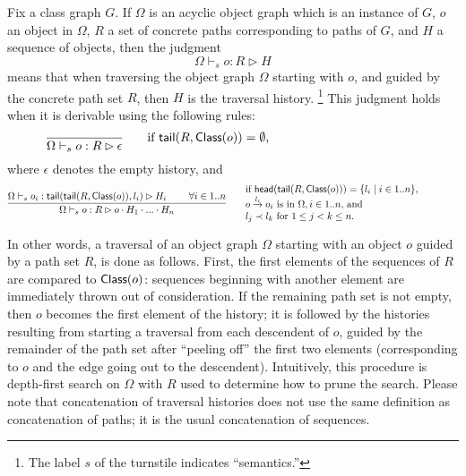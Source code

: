 \begin{definition}
\label{def-traversal}
Fix a class graph $G$.  If $\Omega$ is an acyclic object graph which
is an instance of $G$, $o$ an object in $\Omega$, $R$ a set of
concrete paths corresponding to paths of $G$, and $H$ a sequence of
objects, then the judgment $$\Omega \vdash_s o:R \rhd H$$ means that
when traversing the object graph $\Omega$ starting with $o$, and
guided by the concrete path set $R$, then $H$ is the {\sf traversal
history}.%
\footnote{The label $s$ of the turnstile indicates ``semantics.''}
This judgment holds when it is derivable using the following rules:
\begin{equation}
\label{eq-traversal-empty}
\irule{}
      {\Omega \vdash_s o: R \rhd \epsilon}
   ~~~~~~
      \parbox{3in}{
       if $\Chop(R,\Class(o))=\emptyset$,}
\end{equation}
where $\epsilon$ denotes the empty history, and
\begin{equation}
\label{eq-traversal-recursive}
\irule{\Omega \vdash_s o_i: \Chop(\Chop(R,\Class(o)),l_i) \rhd H_i
       \air \forall i \in 1..n}
      {\Omega \vdash_s o: R \rhd o \cdot H_1  \cdot ... \cdot H_n}
   ~~~~~~
      \parbox{3in}{
       if $\First(\Chop(R,\Class(o))) = \{l_i \mid i \in 1..n\}$, \\
                   $\edge o {l_i} {o_i} \mbox{ is in } \Omega,
                   i \in 1..n$, and \\
                   $l_j \prec l_k \mbox{ for } 1 \leq j < k \leq n$.}
\end{equation}
\end{definition}
%
In other words, a traversal of an object graph $\Omega$ starting with
an object $o$ guided by a path set $R$, is done as follows.  First,
the first elements of the sequences of $R$ are compared to
$\mbox{\sf Class}(o)$: sequences beginning with another element are immediately
thrown out of consideration. If the remaining path set is not empty,
then $o$ becomes the first element of the history; it is followed by
the histories resulting from starting a traversal from each descendent
of $o$, guided by the remainder of the path set after ``peeling off''
the first two elements (corresponding to $o$ and the edge going out to
the descendent). Intuitively, this procedure is depth-first search on
$\Omega$ with $R$ used to determine how to prune the search.  Please
note that concatenation of traversal histories does not use the same
definition as concatenation of paths; it is the usual concatenation of
sequences.

